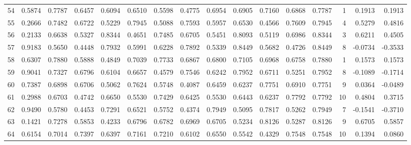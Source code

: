 \begin{tabular}{lrrrrrrrrrrrrrrr}
54  &      0.5874 &  0.7787 &  0.6457 &  0.6094 &  0.6510 &  0.5598 &  0.4775 &  0.6954 &  0.6905 &  0.7160 &   0.6868 &     0.7787 &      1 &                    0.1913 &                     0.1913 \\
55  &      0.2666 &  0.7482 &  0.6722 &  0.5229 &  0.7945 &  0.5088 &  0.7593 &  0.5957 &  0.6530 &  0.4566 &   0.7609 &     0.7945 &      4 &                    0.5279 &                     0.4816 \\
56  &      0.2133 &  0.6638 &  0.5327 &  0.8344 &  0.4651 &  0.7485 &  0.6705 &  0.5451 &  0.8093 &  0.5119 &   0.6986 &     0.8344 &      3 &                    0.6211 &                     0.4505 \\
57  &      0.9183 &  0.5650 &  0.4448 &  0.7932 &  0.5991 &  0.6228 &  0.7892 &  0.5339 &  0.8449 &  0.5682 &   0.4726 &     0.8449 &      8 &                   -0.0734 &                    -0.3533 \\
58  &      0.6307 &  0.7880 &  0.5888 &  0.4849 &  0.7039 &  0.7733 &  0.6867 &  0.6800 &  0.7105 &  0.6968 &   0.6758 &     0.7880 &      1 &                    0.1573 &                     0.1573 \\
59  &      0.9041 &  0.7327 &  0.6796 &  0.6104 &  0.6657 &  0.4579 &  0.7546 &  0.6242 &  0.7952 &  0.6711 &   0.5251 &     0.7952 &      8 &                   -0.1089 &                    -0.1714 \\
60  &      0.7387 &  0.6898 &  0.6706 &  0.5062 &  0.7624 &  0.5748 &  0.4087 &  0.6459 &  0.6237 &  0.7751 &   0.6910 &     0.7751 &      9 &                    0.0364 &                    -0.0489 \\
61  &      0.2988 &  0.6703 &  0.4742 &  0.6650 &  0.5530 &  0.7429 &  0.6425 &  0.5530 &  0.6443 &  0.6237 &   0.7792 &     0.7792 &     10 &                    0.4804 &                     0.3715 \\
62  &      0.9490 &  0.5780 &  0.4453 &  0.7291 &  0.6521 &  0.5752 &  0.4374 &  0.7949 &  0.5095 &  0.7817 &   0.5262 &     0.7949 &      7 &                   -0.1541 &                    -0.3710 \\
63  &      0.1421 &  0.7278 &  0.5853 &  0.4233 &  0.6796 &  0.6782 &  0.6969 &  0.6705 &  0.5234 &  0.8126 &   0.5287 &     0.8126 &      9 &                    0.6705 &                     0.5857 \\
64  &      0.6154 &  0.7014 &  0.7397 &  0.6397 &  0.7161 &  0.7210 &  0.6102 &  0.6550 &  0.5542 &  0.4329 &   0.7548 &     0.7548 &     10 &                    0.1394 &                     0.0860 \\

\end{tabular}
